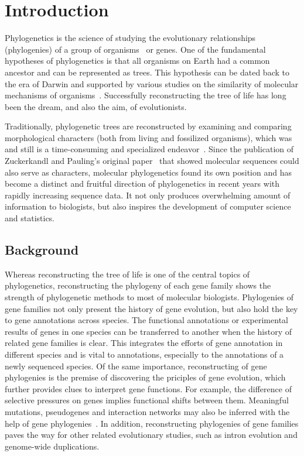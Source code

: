 \chapter{Introduction}

Phylogenetics is the science of studying the evolutionary
relationships (phylogenies) of a group of organisms~\cite{baldauf03} or genes. One of the fundamental
hypotheses of phylogenetics is that all organisms on Earth had a common ancestor and
can be represented as trees. This hypothesis can be dated back to the era of Darwin
and  supported by various studies on the similarity of molecular mechanisms of
organisms~\cite{durbin98}. Successfully reconstructing the tree of life has long been
the dream, and also the aim, of evolutionists.

Traditionally, phylogenetic trees are reconstructed by examining and comparing
morphological characters (both from living and fossilized organisms), which
was and still is a time-consuming and specialized endeavor~\cite{cotton03}.
Since the publication of Zuckerkandl and Pauling's original paper~\cite{zuckerkandl65} that
showed molecular sequences could also serve as characters, molecular phylogenetics
found its own position and has become
a distinct and fruitful direction of phylogenetics in recent years with
rapidly increasing sequence data. It not only
produces  overwhelming amount of information to biologists, but also
inspires the development of computer science and statistics.

\section{Background}

Whereas reconstructing the tree of life is one of the central topics of phylogenetics,
reconstructing the phylogeny of each gene family shows the strength of phylogenetic methods
to most of molecular biologists. Phylogenies of gene families not only present
the history of gene evolution, but also hold the key to gene annotations
across species. The functional annotations or experimental results of genes in one
species can be transferred to another when the history of related gene families is
clear. This integrates the efforts of gene annotation in different species and is vital
to annotations, especially to the annotations of a newly sequenced species.
Of the same importance, reconstructing of gene phylogenies is the premise of discovering
the priciples of gene evolution, which further provides clues to interpret gene functions.
For example, the difference of selective pressures on genes implies functional shifts between
them. Meaningful mutations, pseudogenes and interaction networks may also be inferred
with the help of gene phylogenies~\cite{ng03,coin04}. In addition, reconstructing phylogenies of gene families paves
the way for other related evolutionary studies, such as intron evolution and genome-wide
duplications.

